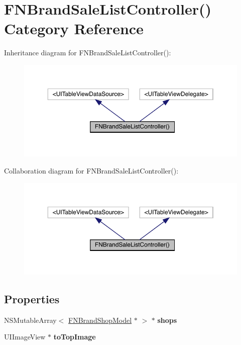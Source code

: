 \hypertarget{category_f_n_brand_sale_list_controller_07_08}{}\section{F\+N\+Brand\+Sale\+List\+Controller() Category Reference}
\label{category_f_n_brand_sale_list_controller_07_08}


Inheritance diagram for F\+N\+Brand\+Sale\+List\+Controller()\+:\nopagebreak
\begin{figure}[H]
\begin{center}
\leavevmode
\includegraphics[width=350pt]{category_f_n_brand_sale_list_controller_07_08__inherit__graph}
\end{center}
\end{figure}


Collaboration diagram for F\+N\+Brand\+Sale\+List\+Controller()\+:\nopagebreak
\begin{figure}[H]
\begin{center}
\leavevmode
\includegraphics[width=350pt]{category_f_n_brand_sale_list_controller_07_08__coll__graph}
\end{center}
\end{figure}
\subsection*{Properties}
\begin{DoxyCompactItemize}
\item 
\mbox{\label{category_f_n_brand_sale_list_controller_07_08_aa2bb07a4505ce1d928799f9463719717}} 
N\+S\+Mutable\+Array$<$ \mbox{\hyperlink{interface_f_n_brand_shop_model}{F\+N\+Brand\+Shop\+Model}} $\ast$ $>$ $\ast$ {\bfseries shops}
\item 
\mbox{\label{category_f_n_brand_sale_list_controller_07_08_ad2a4186d173375e08eb6e07b3e04437d}} 
U\+I\+Image\+View $\ast$ {\bfseries to\+Top\+Image}
\end{DoxyCompactItemize}


